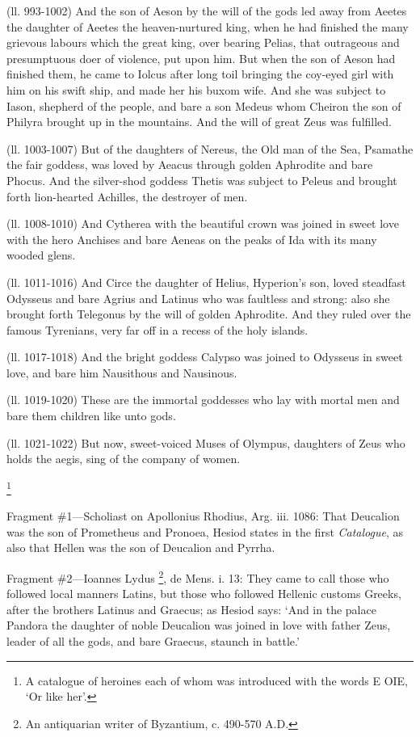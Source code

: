 (ll. 993-1002) And the son of Aeson by the will of the gods led away from
Aeetes the daughter of Aeetes the heaven-nurtured king, when he had finished
the many grievous labours which the great king, over bearing Pelias, that
outrageous and presumptuous doer of violence, put upon him. But when the son of
Aeson had finished them, he came to Iolcus after long toil bringing the
coy-eyed girl with him on his swift ship, and made her his buxom wife. And she
was subject to Iason, shepherd of the people, and bare a son Medeus whom
Cheiron the son of Philyra brought up in the mountains. And the will of great
Zeus was fulfilled.

(ll. 1003-1007) But of the daughters of Nereus, the Old man of the Sea,
Psamathe the fair goddess, was loved by Aeacus through golden Aphrodite and
bare Phocus. And the silver-shod goddess Thetis was subject to Peleus and
brought forth lion-hearted Achilles, the destroyer of men.

(ll. 1008-1010) And Cytherea with the beautiful crown was joined in sweet love
with the hero Anchises and bare Aeneas on the peaks of Ida with its many wooded
glens.

(ll. 1011-1016) And Circe the daughter of Helius, Hyperion’s son, loved
steadfast Odysseus and bare Agrius and Latinus who was faultless and strong:
also she brought forth Telegonus by the will of golden Aphrodite. And they
ruled over the famous Tyrenians, very far off in a recess of the holy islands.

(ll. 1017-1018) And the bright goddess Calypso was joined to Odysseus in sweet
love, and bare him Nausithous and Nausinous.

(ll. 1019-1020) These are the immortal goddesses who lay with mortal men and
bare them children like unto gods.

(ll. 1021-1022) But now, sweet-voiced Muses of Olympus, daughters of Zeus who
holds the aegis, sing of the company of women.


\footnote{A catalogue of heroines
each of whom was introduced with the words E OIE, ‘Or like her’.}

Fragment \#1—Scholiast on Apollonius Rhodius, Arg. iii. 1086: That
Deucalion was the son of Prometheus and Pronoea, Hesiod states in the first
\emph{Catalogue}, as also that Hellen was the son of Deucalion and
Pyrrha.

Fragment \#2—Ioannes Lydus \footnote{An antiquarian writer of
Byzantium, c. 490-570 A.D.}, de Mens.
i. 13: They came to call those who followed local manners Latins, but those who
followed Hellenic customs Greeks, after the brothers Latinus and Graecus; as
Hesiod says: ‘And in the palace Pandora the daughter of noble Deucalion
was joined in love with father Zeus, leader of all the gods, and bare Graecus,
staunch in battle.’


